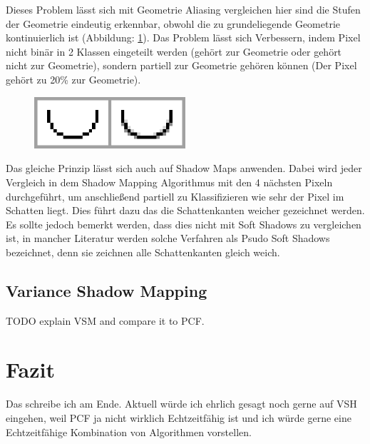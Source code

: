 Dieses Problem lässt sich mit Geometrie Aliasing vergleichen hier sind die Stufen der Geometrie eindeutig erkennbar,
obwohl die zu grundeliegende Geometrie kontinuierlich ist (Abbildung: \ref{fig:pixel-aliasing}). 
Das Problem lässt sich Verbessern, indem Pixel nicht binär in 2 Klassen eingeteilt werden 
(gehört zur Geometrie oder gehört nicht zur Geometrie), sondern partiell zur Geometrie gehören können (Der Pixel gehört zu 20\% zur Geometrie).
\begin{figure}
	\begin{center}
		\includegraphics[width=0.5\textwidth]{res/img/pixel-aliasing/image.png}
    \caption{}
	\end{center}
	\label{fig:pixel-aliasing}
\end{figure}
\newline \newline
Das gleiche Prinzip lässt sich auch auf Shadow Maps anwenden.
Dabei wird jeder Vergleich in dem Shadow Mapping Algorithmus mit den 4 nächsten Pixeln durchgeführt,
um anschließend partiell zu Klassifizieren wie sehr der Pixel im Schatten liegt.
Dies führt dazu das die Schattenkanten weicher gezeichnet werden. 
Es sollte jedoch bemerkt werden, dass dies nicht mit Soft Shadows zu vergleichen ist, 
in mancher Literatur werden solche Verfahren als Psudo Soft Shadows bezeichnet, denn sie 
zeichnen alle Schattenkanten gleich weich.
\section{Variance Shadow Mapping}
\label{section:vsm}
TODO explain VSM and compare it to PCF.

\chapter{Fazit}
Das schreibe ich am Ende. Aktuell würde ich ehrlich gesagt noch gerne auf VSH eingehen,
weil PCF ja nicht wirklich Echtzeitfähig ist und
ich würde gerne eine Echtzeitfähige Kombination von Algorithmen vorstellen.

















